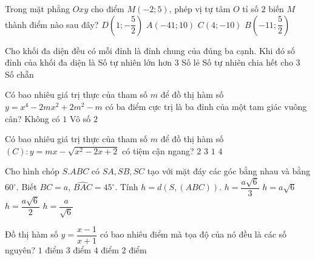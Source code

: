 \begin{ex}%
Trong mặt phẳng $Oxy$ cho điểm $M(-2;5)$, phép vị tự tâm $O$ tỉ số $2$ biến $M$ thành điểm nào sau đây?
\choice
{$D\left (1;-\dfrac{5}{2}\right )$}
{\True $A\left (-41;10\right )$}
{$C\left (4;-10\right )$}
{$B\left (-11;\dfrac{5}{2}\right )$}
\end{ex}

\begin{ex}%
Cho khối đa diện đều có mỗi đỉnh là đỉnh chung của đúng ba cạnh. Khi đó số đỉnh của khối đa diện là
\choice
{Số tự nhiên lớn hơn $3$}
{Số lẻ}
{Số tự nhiên chia hết cho $3$}
{\True Số chẵn}
\end{ex}

\begin{ex}%
Có bao nhiêu giá trị thực của tham số $m$ để đồ thị hàm số $y=x^4-2mx^2+2m^2-m$ có ba điểm cực trị là ba đỉnh của một tam giác vuông cân?
\choice
{Không có}
{\True $1$}
{Vô số}
{$2$}
\end{ex}

\begin{ex}%
Có bao nhiêu giá trị thực của tham số $m$ để đồ thị hàm số $(C):y=mx-\sqrt{x^2-2x+2}$ có tiệm cận ngang?
\choice
{\True $2$}
{$3$}
{$1$}
{$4$}
\end{ex}

\begin{ex}%
Cho hình chóp $S.ABC$ có $SA,SB,SC$ tạo với mặt đáy các góc bằng nhau và bằng $60^\circ$. Biết $BC=a$, $\widehat{BAC} =45^\circ$. Tính $h=d(S,(ABC))$. 
\choice
{$h=\dfrac{a\sqrt{6}}{3}$}
{$h=a\sqrt{6}$}
{\True $h=\dfrac{a\sqrt{6}}{2}$}
{$h=\dfrac{a}{\sqrt{6}}$}
\end{ex}

\begin{ex}%
Đồ thị hàm số $y=\dfrac{x-1}{x+1}$ có bao nhiêu điểm mà tọa độ của nó đều là các số nguyên?
\choice
{$1$ điểm}
{$3$ điểm}
{\True $4$ điểm}
{$2$ điểm}
\end{ex}


